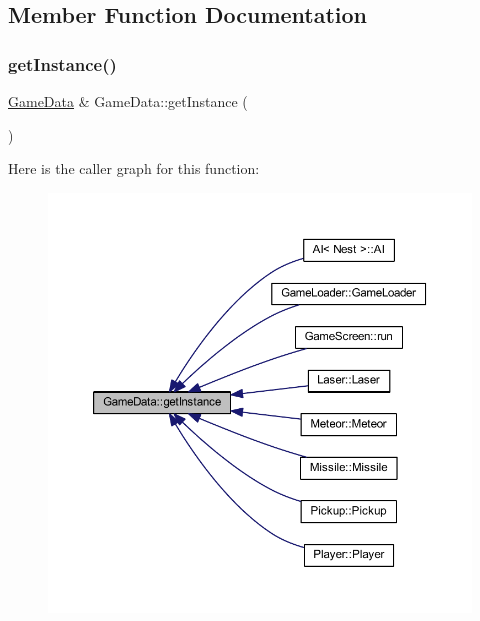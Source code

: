 \subsection{Member Function Documentation}
\mbox{\label{class_game_data_a5930d5371cde0a43f4fa05b6b7152bb8}} 
\subsubsection{\texorpdfstring{get\+Instance()}{getInstance()}}
{\footnotesize\ttfamily \hyperlink{class_game_data}{Game\+Data} \& Game\+Data\+::get\+Instance (\begin{DoxyParamCaption}{ }\end{DoxyParamCaption})\hspace{0.3cm}{\ttfamily [static]}}

Here is the caller graph for this function\+:
\nopagebreak
\begin{figure}[H]
\begin{center}
\leavevmode
\includegraphics[width=350pt]{class_game_data_a5930d5371cde0a43f4fa05b6b7152bb8_icgraph}
\end{center}
\end{figure}
\mbox{\label{class_game_data_acf4e9f7e0bbd359c54d048ccdbbdcd2b}} 
